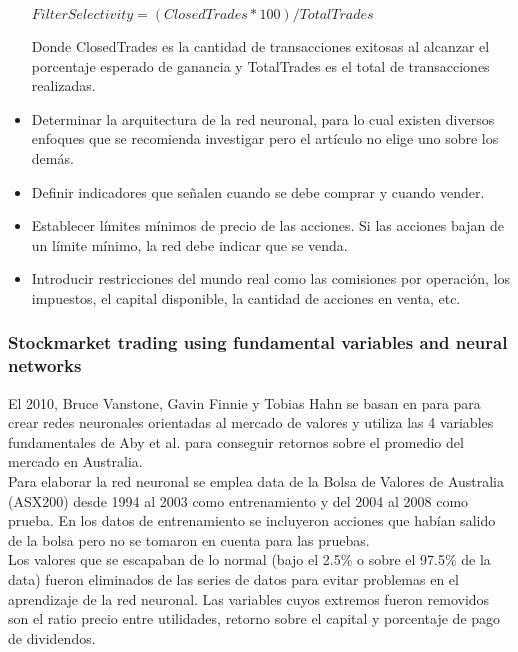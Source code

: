 \begin{itemize}
$FilterSelectivity =(ClosedTrades *100)/TotalTrades$

Donde ClosedTrades es la cantidad de transacciones exitosas al alcanzar el porcentaje esperado de ganancia y TotalTrades es el total de transacciones realizadas.

\item Determinar la arquitectura de la red neuronal, para lo cual existen diversos enfoques que se recomienda investigar pero el artículo no elige uno sobre los demás.

\item Definir indicadores que señalen cuando se debe comprar y cuando vender.

\item Establecer límites mínimos de precio de las acciones. Si las acciones bajan de un límite mínimo, la red debe indicar que se venda.

\item Introducir restricciones del mundo real como las comisiones por operación, los impuestos, el capital disponible, la cantidad de acciones en venta, etc.
\end{itemize}

\subsubsection{Stockmarket trading using fundamental variables and neural networks}

El 2010, Bruce Vanstone, Gavin Finnie y Tobias Hahn \cite{Vanstone2010} se basan en \cite{Vanstone2009} para para crear redes neuronales orientadas al mercado de valores y utiliza las 4 variables fundamentales de Aby et al. \cite{Aby2001} para conseguir retornos sobre el promedio del mercado en Australia.\\

Para elaborar la red neuronal se emplea data de la Bolsa de Valores de Australia (ASX200) desde 1994 al 2003 como entrenamiento y del 2004 al 2008 como prueba. En los datos de entrenamiento se incluyeron acciones que habían salido de la bolsa pero no se tomaron en cuenta para las pruebas.\\

Los valores que se escapaban de lo normal (bajo el 2.5\% o sobre el 97.5\% de la data) fueron eliminados de las series de datos para evitar problemas en el aprendizaje de la red neuronal. Las variables cuyos extremos fueron removidos son el ratio precio entre utilidades, retorno sobre el capital y porcentaje de pago de dividendos.\\

